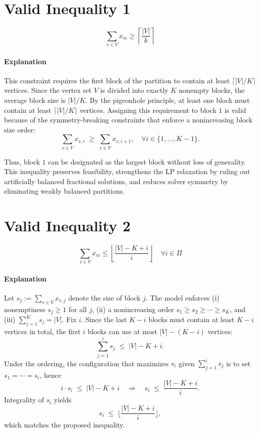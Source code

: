 \section{Valid Inequality 1}
\begin{equation}
    \sum_{v \in V} x_{vi} \geq \left\lceil \frac{|V|}{k} \right\rceil
\end{equation}
\paragraph{Explanation} This constraint requires the first block of the partition to contain at least 
$\lceil |V|/K \rceil$ vertices. Since the vertex set $V$ is divided into exactly 
$K$ nonempty blocks, the average block size is $|V|/K$. By the pigeonhole principle, 
at least one block must contain at least $\lceil |V|/K \rceil$ vertices. Assigning 
this requirement to block $1$ is valid because of the symmetry-breaking constraints 
that enforce a nonincreasing block size order:
\[
\sum_{v \in V} x_{v,i} \;\geq\; \sum_{v \in V} x_{v,i+1}, \quad 
\forall i \in \{1,\dots,K-1\}.
\]
 
Thus, block $1$ can be designated as the largest block without loss of generality. 
This inequality preserves feasibility, strengthens the LP relaxation by ruling out 
artificially balanced fractional solutions, and reduces solver symmetry by eliminating 
weakly balanced partitions.

\section{Valid Inequality 2}
\begin{equation}
    \sum_{v \in V} x_{vi} \leq \left\lfloor \frac{|V| - K + i}{i} \right\rfloor \quad \forall i \in \Pi
\end{equation}
\paragraph{Explanation} Let $s_j := \sum_{v\in V} x_{v,j}$ denote the size of block $j$. The model enforces
(i) nonemptiness $s_j \ge 1$ for all $j$, (ii) a nonincreasing order
$s_1 \ge s_2 \ge \cdots \ge s_K$, and (iii) $\sum_{j=1}^K s_j = |V|$.
Fix $i$. Since the last $K-i$ blocks must contain at least $K-i$ vertices in total,
the first $i$ blocks can use at most $|V|-(K-i)$ vertices:
\[
\sum_{j=1}^{i} s_j \;\le\; |V|-K+i.
\]
Under the ordering, the configuration that maximizes $s_i$ given
$\sum_{j=1}^i s_j$ is to set $s_1=\cdots=s_i$, hence
\[
i\cdot s_i \;\le\; |V|-K+i
\quad\Longrightarrow\quad
s_i \;\le\; \frac{|V|-K+i}{i}.
\]
Integrality of $s_i$ yields
\[
s_i \;\le\; \Big\lfloor \frac{|V|-K+i}{i} \Big\rfloor,
\]
which matches the proposed inequality.
 

